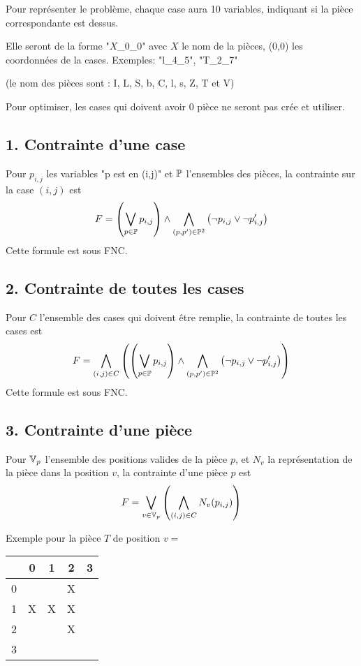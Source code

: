     Pour représenter le problème, chaque case aura 10 variables,
    indiquant si la pièce correspondante est dessus.
    
    Elle seront de la forme "$X$\_0\_0" avec $X$ le nom de la pièces,
    (0,0) les coordonnées de la cases.
    Exemples: "l\_4\_5", "T\_2\_7"
    
    (le nom des pièces sont : I, L, S, b, C, l, s, Z, T et V)
    
    Pour optimiser, les cases qui doivent avoir 0 pièce ne seront pas crée et utiliser.
    
    \subsection*{1. Contrainte d'une case}
    Pour $p_{i,j}$ les variables "p est en (i,j)" et $\mathbb{P}$ l'ensembles des pièces,
    la contrainte sur la case $(i,j)$ est
    \[F = \left(\bigvee_{p\in\mathbb{P}} p_{i,j} \right) \land
        \bigwedge_{(p,p')\in\mathbb{P}^2}\left(\lnot p_{i,j} \lor \lnot p'_{i,j}\right)\]
    Cette formule est sous FNC.
    
    \subsection*{2. Contrainte de toutes les cases}
    Pour $C$ l'ensemble des cases qui doivent être remplie,
    la contrainte de toutes les cases est
    \[F = \bigwedge_{(i,j)\in C} \left(\left(\bigvee_{p\in\mathbb{P}} p_{i,j} \right) \land
        \bigwedge_{(p,p')\in\mathbb{P}^2}\left(\lnot p_{i,j} \lor \lnot p'_{i,j}\right)\right)\]
    Cette formule est sous FNC.
    
    \subsection*{3. Contrainte d'une pièce}
    Pour $\mathbb{V}_p$ l'ensemble des positions valides de la pièce $p$,
    et $N_v$ la représentation de la pièce dans la position $v$,
    la contrainte d'une pièce $p$ est
    \[F = \bigvee_{v\in\mathbb{V}_p} \left( \bigwedge_{(i,j)\in C} N_v(p_{i,j}) \right)\]
    
    Exemple pour la pièce $T$ de position $v =$
    \begin{center}
        \begin{tabular}{| c || *{4}{c |}}
        \hline
          & 0 & 1 & 2 & 3 \\
        \hline
        \hline
        0 &   &   & X &   \\
        \hline
        1 & X & X & X &   \\
        \hline
        2 &   &   & X &   \\
        \hline
        3 &   &   &   &   \\
        \hline
        \end{tabular}
    \end{center}
    

